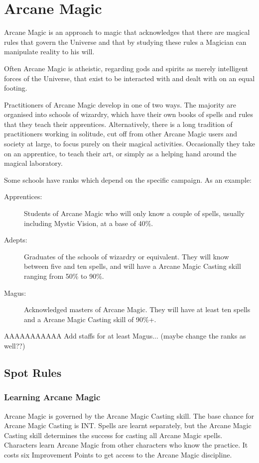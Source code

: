 \chapter{Arcane Magic}
\label{ch:arcane}

Arcane Magic is an approach to magic that acknowledges that there are magical rules that govern the Universe and that by studying these rules a Magician can manipulate reality to his will.

Often Arcane Magic is atheistic, regarding gods and spirits as merely intelligent forces of the Universe, that exist to be interacted with and dealt with on an equal footing. 

Practitioners of Arcane Magic develop in one of two ways. The majority are organised into schools of wizardry, which have their own books of spells and rules that they teach their apprentices. Alternatively, there is a long tradition of practitioners working in solitude, cut off from other Arcane Magic users and society at large, to focus purely on their magical activities. Occasionally they take on an apprentice, to teach their art, or simply as a helping hand around the magical laboratory.

Some schools have ranks which depend on the specific campaign. As an example:
\begin{description}
	\item[Apprentices:] Students of Arcane Magic who will only know a couple of spells, usually including Mystic Vision, at a base of 40\%. 
	\item[Adepts:] Graduates of the schools of wizardry or equivalent. They will know between five and ten spells, and will have a Arcane Magic Casting skill ranging from 50\% to 90\%.
	\item[Magus:] Acknowledged masters of Arcane Magic. They will have at least ten spells and a Arcane Magic Casting skill of 90\%+.
\end{description}

AAAAAAAAAAA Add staffs for at least Magus... (maybe change the ranks as well??)

\section{Spot Rules}

\subsection{Learning Arcane Magic}
Arcane Magic is governed by the Arcane Magic Casting skill. The base chance for Arcane Magic Casting is INT. Spells are learnt separately, but the Arcane Magic Casting skill determines the success for casting all Arcane Magic spells. Characters learn Arcane Magic from other characters who know the practice. It costs six Improvement Points to get access to the Arcane Magic discipline. 

